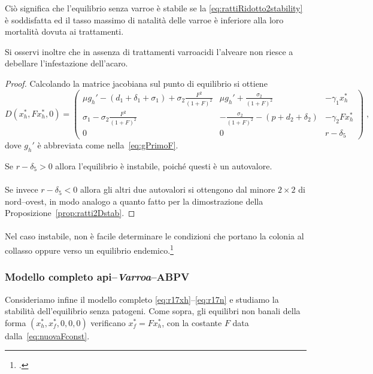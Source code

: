 Ciò significa che l'equilibrio senza varroe è stabile se la \eqref{eq:rattiRidotto2stability} è soddisfatta
ed il tasso massimo di natalità delle varroe è inferiore alla loro mortalità dovuta ai trattamenti.

Si osservi inoltre che in assenza di trattamenti varroacidi l'alveare non riesce a debellare l'infestazione dell'acaro.

\begin{proof}
Calcolando la matrice jacobiana sul punto di equilibrio si ottiene
$$ D (x_h^* , F x_h^* , 0) =
\begin{pmatrix}
    \mu g_h' - (d_1 +\delta_1 +\sigma_1) + \sigma_2 \frac{F^2}{(1+F)^2} &
    \mu g_h' + \frac{\sigma_2}{(1+F)^2} &
    -\gamma_1 x_h^*
    \\
    \sigma_1 - \sigma_2 \frac{F^2}{(1+F)^2} &
    - \frac{\sigma_2}{(1+F)^2} - ( p +d_2 +\delta_2) &
    - \gamma_2 F x_h^*
    \\
    0 &
    0 &
    r -\delta_5
    \end{pmatrix}
    \; ,
$$
dove $g_h'$ è abbreviata come nella~\eqref{eq:gPrimoF}.

Se $r -\delta_5 > 0$ allora l'equilibrio è instabile, poiché questi è un autovalore.

\paragraph{}
Se invece $r - \delta_5 <0$ allora gli altri due autovalori si ottengono dal minore $2 \times 2$
di nord--ovest, in modo analogo a quanto fatto
per la dimostrazione della Proposizione~\ref{prop:ratti2Dstab}.
\end{proof}

\paragraph{}
Nel caso instabile, non è facile determinare le condizioni che portano la colonia al collasso oppure
verso un equilibrio endemico.\footcite[15]{ratti2017}


\subsubsection{Modello completo api--\emph{Varroa}--ABPV}
Consideriamo infine il modello completo \eqref{eq:r17xh}--\eqref{eq:r17n} e studiamo la stabilità dell'equilibrio senza patogeni. Come sopra, gli equilibri non banali della forma $(x_h^*, x_f^*, 0,0,0)$ verificano $x_f^* = F x_h^*$, con
la costante $F$ data dalla~\eqref{eq:nuovaFconst}.


